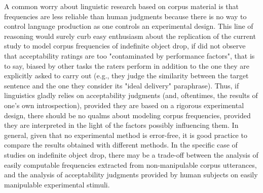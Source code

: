 A common worry about linguistic research based on corpus material is that frequencies are less reliable than human judgments because there is no way to control language production as one controls an experimental design. This line of reasoning would surely curb easy enthusiasm about the replication of the current study to model corpus frequencies of indefinite object drop, if \textcite{Steube2008, Schutze2016} did not observe that acceptability ratings are too "contaminated by performance factors", that is to say, biased by other tasks the raters perform in addition to the one they are explicitly asked to carry out (e.g., they judge the similarity between the target sentence and the one they consider its "ideal delivery" paraphrase). Thus, if linguistics gladly relies on acceptability judgments (and, oftentimes, the results of one's own introspection), provided they are based on a rigorous experimental design, there should be no qualms about modeling corpus frequencies, provided they are interpreted in the light of the factors possibly influencing them. In general, given that no experimental method is error-free, it is good practice to compare the results obtained with different methods. In the specific case of studies on indefinite object drop, there may be a trade-off between the analysis of easily computable frequencies extracted from non-manipulable corpus utterances, and the analysis of acceptability judgments provided by human subjects on easily manipulable experimental stimuli.\\ %
